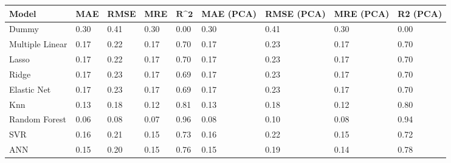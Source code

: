\begin{table}
\centering
\label{table:iri_reg_pred}
\begin{tabular}{lllllllll}
\toprule
 \textbf{Model} & \textbf{MAE} & \textbf{RMSE} & \textbf{MRE} & $\textbf{R^2}$ & \textbf{MAE (PCA)} & \textbf{RMSE (PCA)} & \textbf{MRE (PCA)} & \textbf{R2 (PCA)} \\
\midrule
          Dummy &         0.30 &          0.41 &         0.30 &           0.00 &               0.30 &                0.41 &               0.30 &              0.00 \\
Multiple Linear &         0.17 &          0.22 &         0.17 &           0.70 &               0.17 &                0.23 &               0.17 &              0.70 \\
          Lasso &         0.17 &          0.22 &         0.17 &           0.70 &               0.17 &                0.23 &               0.17 &              0.70 \\
          Ridge &         0.17 &          0.23 &         0.17 &           0.69 &               0.17 &                0.23 &               0.17 &              0.70 \\
    Elastic Net &         0.17 &          0.23 &         0.17 &           0.69 &               0.17 &                0.23 &               0.17 &              0.70 \\
            Knn &         0.13 &          0.18 &         0.12 &           0.81 &               0.13 &                0.18 &               0.12 &              0.80 \\
  Random Forest &         0.06 &          0.08 &         0.07 &           0.96 &               0.08 &                0.10 &               0.08 &              0.94 \\
            SVR &         0.16 &          0.21 &         0.15 &           0.73 &               0.16 &                0.22 &               0.15 &              0.72 \\
            ANN &         0.15 &          0.20 &         0.15 &           0.76 &               0.15 &                0.19 &               0.14 &              0.78 \\
\bottomrule
\end{tabular}
\end{table}

